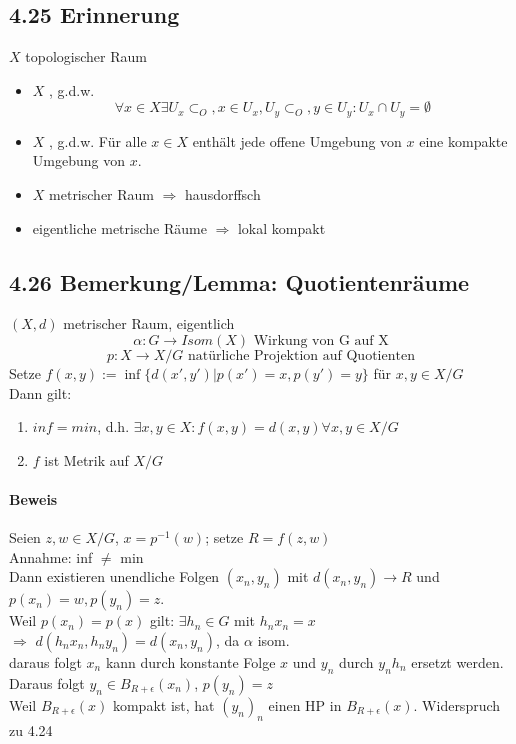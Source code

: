 \documentclass{article}
\begin{document}
\subsection{4.25 Erinnerung} $X$ topologischer Raum
\begin{itemize}
	\item $X$ , g.d.w.
	\[\forall x \in X \exists U_x \subset_O, x \in U_x, U_y \subset_O, y \in U_y: U_x \cap U_y = \emptyset  \]
	\item $X$ , g.d.w.
	Für alle $x \in X$ enthält jede offene Umgebung von $x$ eine kompakte Umgebung von $x$.
	\item $X$ metrischer Raum $\Longrightarrow$ hausdorffsch
	\item eigentliche metrische Räume $\Longrightarrow$ lokal kompakt
\end{itemize}

\subsection{4.26 Bemerkung/Lemma: Quotientenräume}

$(X,d)$ metrischer Raum, eigentlich
\[\alpha : G \rightarrow Isom(X) \text{ Wirkung von G auf X} \]
\[p : X \rightarrow X/G \text{ natürliche Projektion auf Quotienten} \]
Setze $f(x,y) := \inf\{d(x',y') | p(x') = x, p(y') = y\}$ für $x,y \in X/G$\\
Dann gilt:
\begin{enumerate}
	\item $inf = min$, d.h. $\exists x,y \in X: f(x,y) = d(x,y) \forall x,y \in X/G$
	\item $f$ ist Metrik auf $X/G$
\end{enumerate}

\paragraph{Beweis}
Seien $z,w \in X/G$, $x = p^{-1}(w)$; setze $R = f(z,w)$\\
Annahme: inf $\neq$ min\\
Dann existieren unendliche Folgen $(x_n,y_n)$ mit $d(x_n,y_n) \rightarrow R$ und $p(x_n) = w, p(y_n) = z$.\\
Weil $p(x_n) = p(x)$ gilt: $\exists h_n \in G$ mit $h_nx_n = x$\\
$\Longrightarrow$ $d(h_nx_n, h_ny_n) = d(x_n,y_n)$, da $\alpha$ isom.\\
daraus folgt $x_n$ kann durch konstante Folge $x$ und $y_n$ durch $y_nh_n$ ersetzt werden.\\
Daraus folgt $y_n \in B_{R+\epsilon}(x_n)$, $p(y_n) = z$\\
Weil $B_{R+ \epsilon}(x)$ kompakt ist, hat $(y_n)_n$ einen HP in $B_{R+ \epsilon}(x)$. Widerspruch zu 4.24\\
\\
\end{document}
